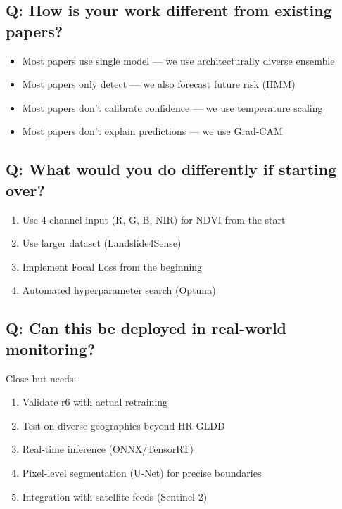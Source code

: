 \documentclass[11pt]{article}
\begin{document}
\subsection{Q: How is your work different from existing papers?}

\begin{itemize}[noitemsep]
    \item Most papers use single model --- we use architecturally diverse ensemble
    \item Most papers only detect --- we also forecast future risk (HMM)
    \item Most papers don't calibrate confidence --- we use temperature scaling
    \item Most papers don't explain predictions --- we use Grad-CAM
\end{itemize}

\subsection{Q: What would you do differently if starting over?}

\begin{enumerate}[noitemsep]
    \item Use 4-channel input (R, G, B, NIR) for NDVI from the start
    \item Use larger dataset (Landslide4Sense)
    \item Implement Focal Loss from the beginning
    \item Automated hyperparameter search (Optuna)
\end{enumerate}

\subsection{Q: Can this be deployed in real-world monitoring?}

Close but needs:
\begin{enumerate}[noitemsep]
    \item Validate r6 with actual retraining
    \item Test on diverse geographies beyond HR-GLDD
    \item Real-time inference (ONNX/TensorRT)
    \item Pixel-level segmentation (U-Net) for precise boundaries
    \item Integration with satellite feeds (Sentinel-2)
\end{enumerate}
\end{document}
